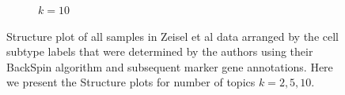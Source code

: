 \begin{figure}[ht]
\begin{subfigure}[t]{0.5\textwidth}
        \raggedright
        \vspace{-0.5in}  \qquad \qquad \caption{   $k=10$}
    \end{subfigure}    
    \caption{Structure plot of all  samples in Zeisel et al data \cite{Zeisel2015} arranged by the cell subtype labels that were determined by the authors using their BackSpin algorithm and subsequent marker gene annotations. Here we present the Structure plots for number of topics $k=2,5,10$. }
    \end{figure}

